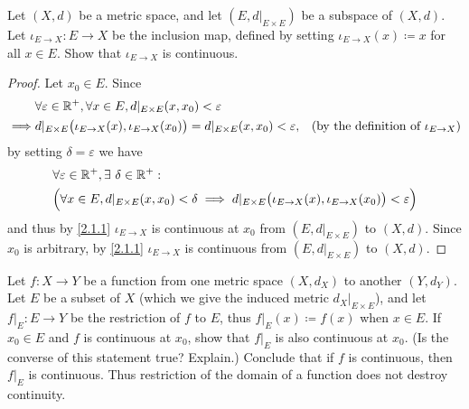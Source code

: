 \begin{ex}\label{ex:2.1.5}
  Let \((X, d)\) be a metric space, and let \((E, d|_{E \times E})\) be a subspace of \((X, d)\).
  Let \(\iota_{E \to X} : E \to X\) be the inclusion map, defined by setting \(\iota_{E \to X}(x) \coloneqq x\) for all \(x \in E\).
  Show that \(\iota_{E \to X}\) is continuous.
\end{ex}

\begin{proof}
  Let \(x_0 \in E\).
  Since
  \begin{align*}
             & \forall \varepsilon \in \mathbb{R}^+, \forall x \in E, d|_{E \times E}(x, x_0) < \varepsilon                                                                           \\
    \implies & d|_{E \times E}\big(\iota_{E \to X}(x), \iota_{E \to X}(x_0)\big) = d|_{E \times E}(x, x_0) < \varepsilon, & \text{(by the definition of \(\iota_{E \to X}\))}
  \end{align*}
  by setting \(\delta = \varepsilon\) we have
  \begin{align*}
     & \forall \varepsilon \in \mathbb{R}^+, \exists\ \delta \in \mathbb{R}^+ :                                                                                             \\
     & \Big(\forall x \in E, d|_{E \times E}(x, x_0) < \delta \implies d|_{E \times E}\big(\iota_{E \to X}(x), \iota_{E \to X}(x_0)\big) < \varepsilon\Big)
  \end{align*}
  and thus by \cref{2.1.1} \(\iota_{E \to X}\) is continuous at \(x_0\) from \((E, d|_{E \times E})\) to \((X, d)\).
  Since \(x_0\) is arbitrary, by \cref{2.1.1} \(\iota_{E \to X}\) is continuous from \((E, d|_{E \times E})\) to \((X, d)\).
\end{proof}

\begin{ex}\label{ex:2.1.6}
  Let \(f : X \to Y\) be a function from one metric space \((X, d_X)\) to another \((Y, d_Y)\).
  Let \(E\) be a subset of \(X\) (which we give the induced metric \(d_X|_{E \times E}\)), and let \(f|_E : E \to Y\) be the restriction of \(f\) to \(E\), thus \(f|_E(x) \coloneqq f(x)\) when \(x \in E\).
  If \(x_0 \in E\) and \(f\) is continuous at \(x_0\), show that \(f|_E\) is also continuous at \(x_0\).
  (Is the converse of this statement true? Explain.)
  Conclude that if \(f\) is continuous, then \(f|_E\) is continuous.
  Thus restriction of the domain of a function does not destroy continuity.
\end{ex}

